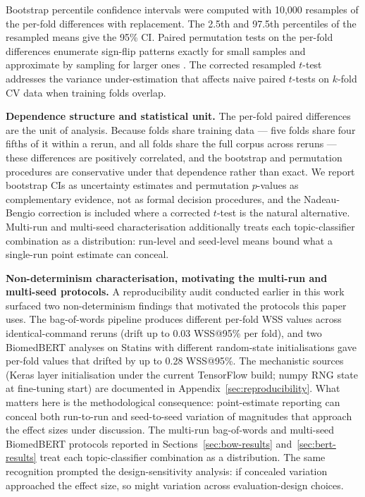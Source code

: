 \documentclass{article}
\begin{document}
Bootstrap percentile confidence intervals were computed with 10,000 resamples of the per-fold differences with replacement. The 2.5th and 97.5th percentiles of the resampled means give the 95\% CI. Paired permutation tests on the per-fold differences enumerate sign-flip patterns exactly for small samples and approximate by sampling for larger ones \cite{phipson2010permutation}. The  corrected resampled $t$-test addresses the variance under-estimation that affects naive paired $t$-tests on $k$-fold CV data when training folds overlap.

\textbf{Dependence structure and statistical unit.} The per-fold paired differences are the unit of analysis. Because folds share training data --- five folds share four fifths of it within a rerun, and all folds share the full corpus across reruns --- these differences are positively correlated, and the bootstrap and permutation procedures are conservative under that dependence rather than exact. We report bootstrap CIs as uncertainty estimates and permutation $p$-values as complementary evidence, not as formal decision procedures, and the Nadeau-Bengio correction is included where a corrected $t$-test is the natural alternative. Multi-run and multi-seed characterisation additionally treats each topic-classifier combination as a distribution: run-level and seed-level means bound what a single-run point estimate can conceal.

\textbf{Non-determinism characterisation, motivating the multi-run and multi-seed protocols.} A reproducibility audit conducted earlier in this work surfaced two non-determinism findings that motivated the protocols this paper uses. The bag-of-words pipeline produces different per-fold WSS values across identical-command reruns (drift up to 0.03 WSS@95\% per fold), and two BiomedBERT analyses on Statins with different random-state initialisations gave per-fold values that drifted by up to 0.28 WSS@95\%. The mechanistic sources (Keras layer initialisation under the current TensorFlow build; numpy RNG state at fine-tuning start) are documented in Appendix~\ref{sec:reproducibility}. What matters here is the methodological consequence: point-estimate reporting can conceal both run-to-run and seed-to-seed variation of magnitudes that approach the effect sizes under discussion. The multi-run bag-of-words and multi-seed BiomedBERT protocols reported in Sections~\ref{sec:bow-results} and~\ref{sec:bert-results} treat each topic-classifier combination as a distribution. The same recognition prompted the design-sensitivity analysis: if concealed variation approached the effect size, so might variation across evaluation-design choices.
\end{document}
